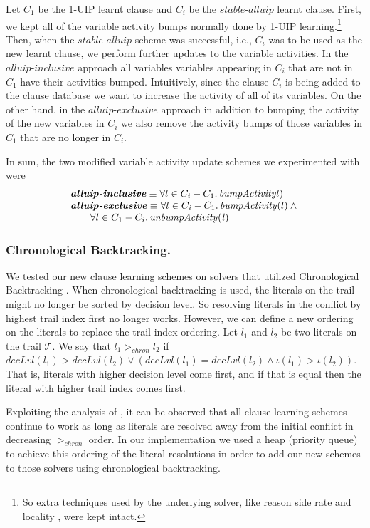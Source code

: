 \documentclass[runningheads]{llncs}
\newcommand{\oneuip}{1-UIP\xspace}
\newcommand{\stablealluip}{\textit{stable-alluip}\xspace}
\newcommand{\allUipIn}{\textit{alluip-inclusive}}
\newcommand{\allUipEx}{\textit{alluip-exclusive}}
\newcommand{\trail}{\ensuremath{\mathcal{T}}}
\newcommand{\trailIdx}[1]{\ensuremath{\iota(#1)}}
\newcommand{\dlevel}[1]{\ensuremath{\mathit{decLvl}(#1)}}
\begin{document}
Let $C_1$ be the \oneuip learnt clause and $C_i$ be the $\stablealluip$ learnt
clause. First, we kept all of the variable activity bumps normally
done by \oneuip learning.\footnote{So extra techniques used by the
  underlying solver, like reason side rate and locality
  \cite{DBLP:conf/sat/LiangGPC16}, were kept intact.}  Then, when the
$\stablealluip$ scheme was successful, i.e., $C_i$ was to be used as the new
learnt clause, we perform further updates to the variable
activities. In the $\allUipIn$ approach all variables variables
appearing in $C_i$ that are not in $C_1$ have their activities
bumped. Intuitively, since the clause $C_i$ is being added to the
clause database we want to increase the activity of all of its
variables. On the other hand, in the $\allUipEx$ approach in addition
to bumping the activity of the new variables in $C_i$ we also remove
the activity bumps of those variables in $C_1$ that are no longer in
$C_i$.

In sum, the two modified variable activity update schemes we
experimented with were
\[
    \begin{array}{l}
    \textbf{\allUipIn} \equiv \forall l\in C_i - C_1.\,\mathit{bumpActivity}l) \\
    \textbf{\allUipEx} \equiv \forall l\in C_i - C_1.\,\mathit{bumpActivity}(l) \land\mbox{} \\
    \qquad \forall l\in C_1 - C_i.\,\mathit{unbumpActivity(l)}
  \end{array}
\]

\subsubsection{Chronological Backtracking.}
We tested our new clause learning schemes on solvers that utilized
Chronological Backtracking
\cite{DBLP:conf/sat/NadelR18,DBLP:conf/sat/MohleB19}. When
chronological backtracking is used, the literals on the trail might no
longer be sorted by decision level. So resolving literals in the
conflict by highest trail index first no longer works. However, we can
define a new ordering on the literals to replace the trail index
ordering. Let $l_1$ and $l_2$ be two literals on the trail
$\trail$. We say that $l_1 >_{\mathit{chron}} l_2$ if
$\dlevel{l_1} > \dlevel{l_2} \lor (\dlevel{l_1} = \dlevel{l_2} \land
\trailIdx{l_1} > \trailIdx{l_2})$. That is, literals with higher
decision level come first, and if that is equal then the literal with
higher trail index comes first.

Exploiting the analysis of \cite{DBLP:conf/sat/MohleB19}, it can be
observed that all clause learning schemes continue to work as long as
literals are resolved away from the initial conflict in decreasing
$>_{\mathit{chron}}$ order. In our implementation we used a heap
(priority queue) to achieve this ordering of the literal resolutions
in order to add our new schemes to those solvers using chronological
backtracking.
\end{document}
